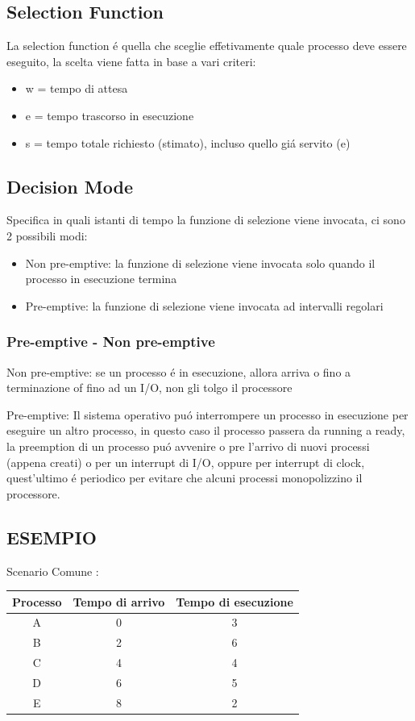     \subsection{Selection Function}
    La selection function é quella che sceglie effetivamente quale processo deve essere eseguito,
    la scelta viene fatta in base a vari criteri:
    \begin{itemize}
        \item w = tempo di attesa
        \item e = tempo trascorso in esecuzione
        \item s = tempo totale richiesto (stimato), incluso quello giá servito (e)
    \end{itemize}
    \subsection{Decision Mode}
    Specifica in quali istanti di tempo la funzione di selezione viene invocata, ci sono 2 possibili modi:
    \begin{itemize}
        \item Non pre-emptive: la funzione di selezione viene invocata solo quando il processo in esecuzione termina
        \item Pre-emptive: la funzione di selezione viene invocata ad intervalli regolari
    \end{itemize}
    \subsubsection{Pre-emptive - Non pre-emptive}
    Non pre-emptive: se un processo é in esecuzione, allora arriva o fino a terminazione of fino ad un I/O, non gli tolgo il processore

    Pre-emptive: Il sistema operativo puó interrompere un processo in esecuzione per eseguire un altro processo, in questo caso il processo
    passera da running a ready, la preemption di un processo puó avvenire o pre l'arrivo di nuovi processi (appena creati) o per un interrupt di I/O,
    oppure per interrupt di clock, quest'ultimo é periodico per evitare che alcuni processi monopolizzino il processore.
    \subsection{ESEMPIO}
    Scenario Comune :
    \begin{table}[H]
        \raggedright
        \begin{tabular}{|c|c|c|}
            \hline
            \textbf{Processo} & \textbf{Tempo di arrivo} & \textbf{Tempo di esecuzione} \\
            \hline
            A & 0 & 3   \\
            \hline
            B & 2 & 6 \\
            \hline
            C & 4 & 4  \\
            \hline
            D & 6 & 5  \\
            \hline
            E & 8 & 2  \\
            \hline
        \end{tabular}
    \end{table}
